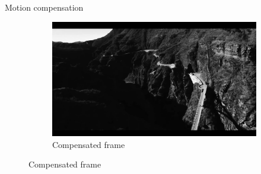 \documentclass[aspectratio=1610,xcolor=dvipsnames]{beamer}
\begin{document}
\begin{frame}{Motion compensation}
\begin{figure}[htbp]
\begin{subfigure}[b]{0.3\textwidth}
            \includegraphics[width=\textwidth]{images/bird-compensated.png}
            \caption{Compensated frame}
            \label{fig:bird-compensated}
        \end{subfigure}
        

\end{figure}
\end{frame}
\end{document}
